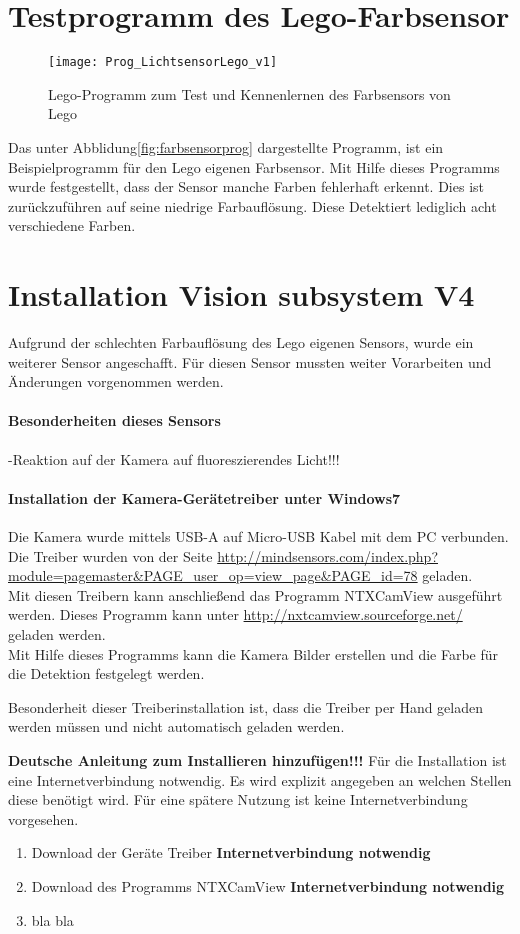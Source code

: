 \section{Testprogramm des Lego-Farbsensor}
\begin{figure}[htb]
\centering
\texttt{[image: Prog\_LichtsensorLego\_v1]}
\caption{Lego-Programm zum Test und Kennenlernen des Farbsensors von Lego}
\label{fig:farbsensorprog}
\end{figure}
Das unter Abblidung\vref{fig:farbsensorprog} dargestellte Programm, ist ein Beispielprogramm für den Lego eigenen Farbsensor. 
Mit Hilfe dieses Programms wurde festgestellt, dass der Sensor manche Farben fehlerhaft erkennt. Dies ist zurückzuführen auf seine niedrige Farbauflösung. Diese Detektiert lediglich acht verschiedene Farben.
\section{Installation Vision subsystem V4}
Aufgrund der schlechten Farbauflösung des Lego eigenen Sensors, wurde ein weiterer Sensor angeschafft. Für diesen Sensor mussten weiter Vorarbeiten und Änderungen vorgenommen werden.
\paragraph{Besonderheiten dieses Sensors}
-Reaktion auf der Kamera auf fluoreszierendes Licht!!!

\paragraph{Installation der Kamera-Gerätetreiber unter Windows7}
Die Kamera wurde mittels USB-A auf Micro-USB Kabel mit dem PC verbunden.
Die Treiber wurden von der Seite \url{http://mindsensors.com/index.php?module=pagemaster&PAGE_user_op=view_page&PAGE_id=78} geladen.\\
Mit diesen Treibern kann anschließend das Programm NTXCamView ausgeführt werden. Dieses Programm kann unter \url{http://nxtcamview.sourceforge.net/} geladen werden.\\
Mit Hilfe dieses Programms kann die Kamera Bilder erstellen und die Farbe für die Detektion festgelegt werden. 

Besonderheit dieser Treiberinstallation ist, dass die Treiber per Hand geladen werden müssen und nicht automatisch geladen werden.

\textbf{Deutsche Anleitung zum Installieren hinzufügen!!!}
Für die Installation ist eine Internetverbindung notwendig. Es wird explizit angegeben an welchen Stellen diese benötigt wird. Für eine spätere Nutzung ist keine Internetverbindung vorgesehen.
\begin{enumerate}
\item Download der Geräte Treiber \textbf{Internetverbindung notwendig}
\item Download des Programms NTXCamView \textbf{Internetverbindung notwendig}
\item bla bla 
\end{enumerate}

